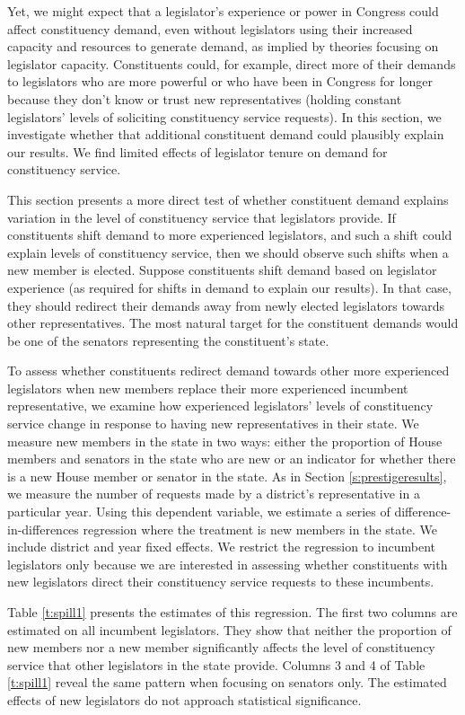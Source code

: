 \documentclass[12pt]{article}
\begin{document}
{Yet, we might expect that a legislator's experience or power in Congress could affect constituency demand, even without legislators using their increased capacity and resources to generate demand, as implied by theories focusing on legislator capacity. Constituents could, for example, direct more of their demands to legislators who are more powerful or who have been in Congress for longer because they don't know or trust new representatives (holding constant legislators' levels of soliciting constituency service requests). In this section, we investigate whether that additional constituent demand could plausibly explain our results. We find limited effects of legislator tenure on demand for constituency service. 

This section presents a more direct test of whether constituent demand explains variation in the level of constituency service that legislators provide. If constituents shift demand to more experienced legislators, and such a shift could explain levels of constituency service, then we should observe such shifts when a new member is elected. Suppose constituents shift demand based on legislator experience (as required for shifts in demand to explain our results). In that case, they should redirect their demands away from newly elected legislators towards other representatives. The most natural target for the constituent demands would be one of the senators representing the constituent's state.

To assess whether constituents redirect demand towards other more experienced legislators when new members replace their more experienced incumbent representative, we examine how experienced legislators' levels of constituency service change in response to having new representatives in their state. We measure new members in the state in two ways: either the proportion of House members and senators in the state who are new or an indicator for whether there is a new House member or senator in the state. As in Section \ref{s:prestigeresults}, we measure the number of requests made by a district's representative in a particular year. Using this dependent variable, we estimate a series of difference-in-differences regression where the treatment is new members in the state. We include district and year fixed effects. We restrict the regression to incumbent legislators only because we are interested in assessing whether constituents with new legislators direct their constituency service requests to these incumbents.   

Table \ref{t:spill1} presents the estimates of this regression. The first two columns are estimated on all incumbent legislators. They show that neither the proportion of new members nor a new member significantly affects the level of constituency service that other legislators in the state provide. Columns 3 and 4 of Table \ref{t:spill1} reveal the same pattern when focusing on senators only. The estimated effects of new legislators do not approach statistical significance.  

}
\end{document}
